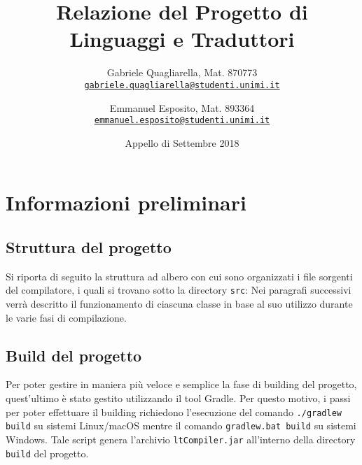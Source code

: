 \documentclass[hidelinks,10pt,a4paper]{article}
\date{Appello di Settembre 2018}
\author{
  Gabriele Quagliarella, Mat. 870773\\
  \texttt{\href{mailto:gabriele.quagliarella@studenti.unimi.it}{gabriele.quagliarella@studenti.unimi.it}}
  \and 
  Emmanuel Esposito, Mat. 893364\\
  \texttt{\href{mailto:emmanuel.esposito@studenti.unimi.it}{emmanuel.esposito@studenti.unimi.it}}
}
\title{Relazione del Progetto di Linguaggi e Traduttori}
\begin{document}
\maketitle
\tableofcontents

\pagebreak

\section{Informazioni preliminari}

\subsection{Struttura del progetto}
Si riporta di seguito la struttura ad albero con cui sono organizzati i file sorgenti del compilatore, i quali si trovano sotto la directory \texttt{src}:
\vspace{10pt}
\vspace{10pt}
Nei paragrafi successivi verrà descritto il funzionamento di ciascuna classe in base al suo utilizzo durante le varie fasi di compilazione.

\subsection{Build del progetto}
Per poter gestire in maniera più veloce e semplice la fase di building del progetto, quest'ultimo è stato gestito utilizzando il tool Gradle.
Per questo motivo, i passi per poter effettuare il building richiedono l'esecuzione del comando \texttt{./gradlew build} su sistemi Linux/macOS mentre il comando \texttt{gradlew.bat build} su sistemi Windows.
Tale script genera l'archivio \texttt{ltCompiler.jar} all'interno della directory \texttt{build} del progetto.
\end{document}
